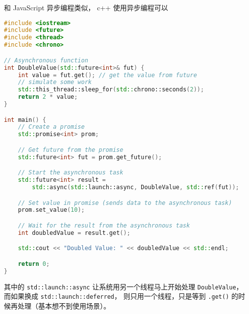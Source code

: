 

\begin{issues}
\issueDraft
\end{issues}

和 JavaScript 异步编程类似， c++ 使用异步编程可以

\begin{lstlisting}[language=cpp]
#include <iostream>
#include <future>
#include <thread>
#include <chrono>

// Asynchronous function
int DoubleValue(std::future<int>& fut) {
    int value = fut.get(); // get the value from future
    // simulate some work
    std::this_thread::sleep_for(std::chrono::seconds(2));
    return 2 * value;
}

int main() {
    // Create a promise
    std::promise<int> prom;

    // Get future from the promise
    std::future<int> fut = prom.get_future();

    // Start the asynchronous task
    std::future<int> result =
        std::async(std::launch::async, DoubleValue, std::ref(fut));

    // Set value in promise (sends data to the asynchronous task)
    prom.set_value(10);

    // Wait for the result from the asynchronous task
    int doubledValue = result.get();

    std::cout << "Doubled Value: " << doubledValue << std::endl;

    return 0;
}
\end{lstlisting}
其中的 \verb`std::launch::async` 让系统用另一个线程马上开始处理 \verb`DoubleValue`， 而如果换成 \verb`std::launch::deferred`， 则只用一个线程，只是等到 \verb`.get()` 的时候再处理（基本想不到使用场景）。
